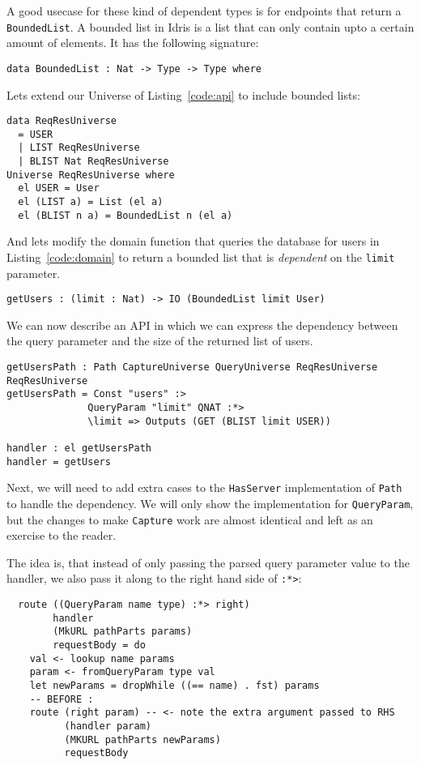 \documentclass[12pt,a4paper]{article}
\begin{document}
A good usecase for these kind of dependent types is for endpoints that return a \texttt{BoundedList}.
A bounded list in Idris is a list that can only contain upto a certain amount of elements. It  has the following signature:
\begin{verbatim}
data BoundedList : Nat -> Type -> Type where
\end{verbatim}

Lets extend our Universe of Listing~\ref{code:api} to include bounded lists:
\begin{verbatim}
data ReqResUniverse
  = USER
  | LIST ReqResUniverse
  | BLIST Nat ReqResUniverse
Universe ReqResUniverse where
  el USER = User
  el (LIST a) = List (el a)
  el (BLIST n a) = BoundedList n (el a)
\end{verbatim}
And lets modify the domain function that queries the database for users
in Listing~\ref{code:domain} to return a bounded list that is \emph{dependent} on the \texttt{limit} parameter.

\begin{verbatim}
getUsers : (limit : Nat) -> IO (BoundedList limit User)
\end{verbatim}
We can now describe an API in which we can express the dependency between the query parameter
and the size of the returned list of users.
\begin{verbatim}
getUsersPath : Path CaptureUniverse QueryUniverse ReqResUniverse ReqResUniverse
getUsersPath = Const "users" :> 
              QueryParam "limit" QNAT :*>
              \limit => Outputs (GET (BLIST limit USER))

handler : el getUsersPath
handler = getUsers
\end{verbatim}

Next, we will need to add extra cases to the \texttt{HasServer}
implementation of \texttt{Path} to handle the dependency. We
will only show the implementation for \texttt{QueryParam},
but the changes to make \texttt{Capture} work are almost identical and left as an exercise to the reader.

The idea is, that instead of only passing the parsed query parameter value
to the handler, we also pass it along to the right hand side of \texttt{:*>}:
\begin{verbatim}
  route ((QueryParam name type) :*> right)
        handler
        (MkURL pathParts params)
        requestBody = do
    val <- lookup name params
    param <- fromQueryParam type val
    let newParams = dropWhile ((== name) . fst) params
    -- BEFORE :
    route (right param) -- <- note the extra argument passed to RHS
          (handler param)
          (MKURL pathParts newParams)
          requestBody

\end{verbatim}
\end{document}
